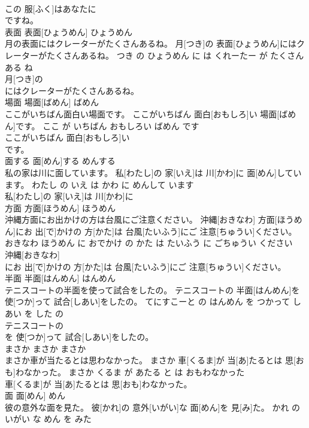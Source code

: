 \documentclass[8pt]{extreport}
\begin{document}
\begin{CJK}{UTF8}{min}
\\	この 服[ふく]はあなたに
\\	ですね。			
\\	表面	表面[ひょうめん]	ひょうめん	
\\	月の表面にはクレーターがたくさんあるね。	月[つき]の 表面[ひょうめん]にはクレーターがたくさんあるね。	つき の ひょうめん に は くれーたー が たくさん ある ね	
\\	月[つき]の
\\	にはクレーターがたくさんあるね。			
\\	場面	場面[ばめん]	ばめん	
\\	ここがいちばん面白い場面です。	ここがいちばん 面白[おもしろ]い 場面[ばめん]です。	ここ が いちばん おもしろい ばめん です	
\\	ここがいちばん 面白[おもしろ]い
\\	です。			
\\	面する	面[めん]する	めんする	
\\	私の家は川に面しています。	私[わたし]の 家[いえ]は 川[かわ]に 面[めん]しています。	わたし の いえ は かわ に めんして います	
\\	私[わたし]の 家[いえ]は 川[かわ]に
\\	方面	方面[ほうめん]	ほうめん	
\\	沖縄方面にお出かけの方は台風にご注意ください。	沖縄[おきなわ] 方面[ほうめん]にお 出[で]かけの 方[かた]は 台風[たいふう]にご 注意[ちゅうい]ください。	おきなわ ほうめん に おでかけ の かた は たいふう に ごちゅうい ください	
\\	沖縄[おきなわ]
\\	にお 出[で]かけの 方[かた]は 台風[たいふう]にご 注意[ちゅうい]ください。			
\\	半面	半面[はんめん]	はんめん	
\\	テニスコートの半面を使って試合をしたの。	テニスコートの 半面[はんめん]を 使[つか]って 試合[しあい]をしたの。	てにすこーと の はんめん を つかって しあい を した の	
\\	テニスコートの
\\	を 使[つか]って 試合[しあい]をしたの。			
\\	まさか	まさか	まさか	
\\	まさか車が当たるとは思わなかった。	まさか 車[くるま]が 当[あ]たるとは 思[おも]わなかった。	まさか くるま が あたる と は おもわなかった	
\\	車[くるま]が 当[あ]たるとは 思[おも]わなかった。			
\\	面	面[めん]	めん	
\\	彼の意外な面を見た。	彼[かれ]の 意外[いがい]な 面[めん]を 見[み]た。	かれ の いがい な めん を みた	

\end{CJK}
\end{document}
